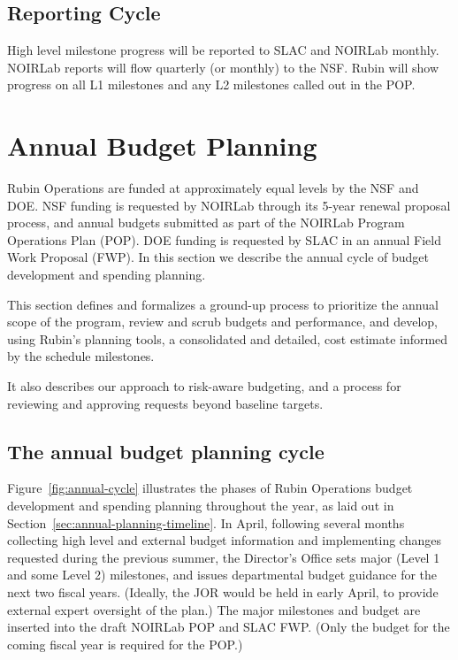 \subsection{Reporting Cycle}

High level milestone progress will be reported to \gls{SLAC} and \gls{NOIRLab} monthly.
\gls{NOIRLab} reports will flow quarterly (or monthly) to the \gls{NSF}.
Rubin will show progress on all L1 milestones and any L2 milestones called out in the \gls{POP}.

\section{Annual Budget Planning}
\label{sec:annual-cycle}

Rubin Operations are funded at approximately equal levels by the \gls{NSF} and \gls{DOE}. \gls{NSF} funding is requested by \gls{NOIRLab} through its 5-year renewal proposal process, and annual budgets submitted as part of the \gls{NOIRLab} Program Operations Plan (\gls{POP}). \gls{DOE} funding is requested by \gls{SLAC} in an annual Field Work Proposal (FWP). In this section we describe the annual cycle of budget development and spending planning.

This section defines and formalizes a ground-up process to
prioritize the annual scope of the program,
review and scrub budgets and performance,
and develop, using Rubin's planning tools, a consolidated and detailed, cost estimate informed by the schedule milestones.

It also describes our approach to risk-aware budgeting, and a process for reviewing and approving requests beyond baseline targets.


\subsection{The annual budget planning cycle}

Figure~\ref{fig:annual-cycle} illustrates the phases of \gls{Rubin Operations} budget development and spending planning throughout the year, as laid out in Section~\ref{sec:annual-planning-timeline}.
In April, following several months collecting high level and external budget information and implementing changes requested during the previous summer, the \gls{Director}'s Office sets major (Level 1 and some Level 2) milestones, and issues departmental budget guidance for the next two fiscal years.
(Ideally, the \gls{JOR} would be held in early April, to provide external expert oversight of the plan.)
The major milestones and budget are inserted into the draft \gls{NOIRLab} \gls{POP} and \gls{SLAC} \gls{FWP}.
(Only the budget for the coming fiscal year is required for the \gls{POP}.)

